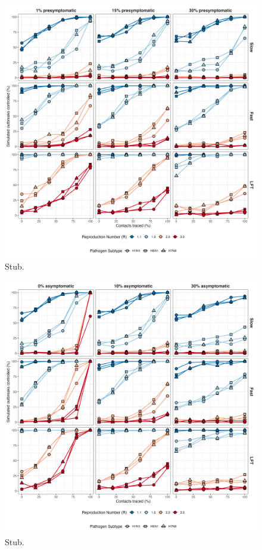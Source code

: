 \documentclass{article}
\begin{document}
\begin{figure}[ht]
\centering
\includegraphics[width=\textwidth]{../plots/prop_outbreak_control_prop_presym_iso.png}
\caption{Stub.}
\label{fig:prop-outbreak-control-prop-presym-iso}
\end{figure}

\begin{figure}[ht]
\centering
\includegraphics[width=\textwidth]{../plots/prop_outbreak_control_prop_asym_iso.png}
\caption{Stub.}
\label{fig:prop-outbreak-control-prop-asym-iso}
\end{figure}
\end{document}
